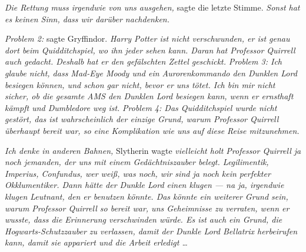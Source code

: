 \emph{Die Rettung muss irgendwie von uns ausgehen,} sagte die letzte Stimme. \emph{Sonst hat es keinen Sinn, dass wir darüber nachdenken.}

\emph{Problem 2:} sagte Gryffindor. \emph{Harry Potter ist nicht verschwunden, er ist genau dort beim Quidditchspiel, wo ihn jeder sehen kann. Daran hat Professor Quirrell auch gedacht. Deshalb hat er den gefälschten Zettel geschickt.}
\emph{Problem 3: Ich glaube nicht, dass Mad-Eye Moody und ein Aurorenkommando den Dunklen Lord besiegen können, und schon gar nicht, bevor er uns tötet. Ich bin mir nicht sicher, ob die gesamte AMS den Dunklen Lord besiegen kann, wenn er ernsthaft kämpft und Dumbledore weg ist.}
\emph{Problem 4: Das Quidditchspiel wurde nicht gestört, das ist wahrscheinlich der einzige Grund, warum Professor Quirrell überhaupt bereit war, so eine Komplikation wie uns auf diese Reise mitzunehmen.}

\emph{Ich denke in anderen Bahnen,} Slytherin wagte \emph{vielleicht holt Professor Quirrell ja noch jemanden, der uns mit einem Gedächtniszauber belegt. Legilimentik, Imperius, Confundus, wer weiß, was noch, wir sind ja noch kein perfekter Okklumentiker. Dann hätte der Dunkle Lord einen klugen — na ja, irgendwie klugen Leutnant, den er benutzen könnte. Das könnte ein weiterer Grund sein, warum Professor Quirrell so bereit war, uns Geheimnisse zu verraten, wenn er wusste, dass die Erinnerung verschwinden würde. Es ist auch ein Grund, die Hogwarts-Schutzzauber zu verlassen, damit der Dunkle Lord Bellatrix herbeirufen kann, damit sie appariert und die Arbeit erledigt …}

